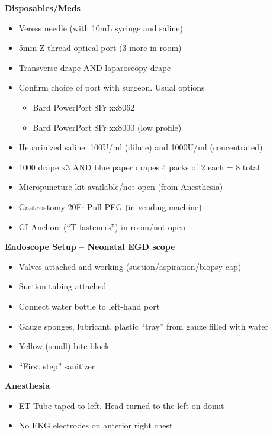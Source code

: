 \documentclass[
]{book}
\providecommand{\tightlist}{%
  \setlength{\itemsep}{0pt}\setlength{\parskip}{0pt}}
\begin{document}
\textbf{Disposables/Meds}

\begin{itemize}
\tightlist
\item
  Veress needle (with 10mL syringe and saline)
\item
  5mm Z-thread optical port (3 more in room)
\item
  Transverse drape AND laparoscopy drape
\item
  Confirm choice of port with surgeon. Usual options

  \begin{itemize}
  \tightlist
  \item
    Bard PowerPort 8Fr xx8062
  \item
    Bard PowerPort 8Fr xx8000 (low profile)
  \end{itemize}
\item
  Heparinized saline: 100U/ml (dilute) and 1000U/ml (concentrated)
\item
  1000 drape x3 AND blue paper drapes 4 packs of 2 each = 8 total
\item
  Micropuncture kit available/not open (from Anesthesia)
\item
  Gastrostomy 20Fr Pull PEG (in vending machine)
\item
  GI Anchors (``T-fasteners'') in room/not open
\end{itemize}

\textbf{Endoscope Setup -- Neonatal EGD scope}

\begin{itemize}
\tightlist
\item
  Valves attached and working (suction/aspiration/biopsy cap)
\item
  Suction tubing attached
\item
  Connect water bottle to left-hand port
\item
  Gauze sponges, lubricant, plastic ``tray'' from gauze filled with water
\item
  Yellow (small) bite block
\item
  ``First step'' sanitizer
\end{itemize}

\textbf{Anesthesia}

\begin{itemize}
\tightlist
\item
  ET Tube taped to left. Head turned to the left on donut
\item
  No EKG electrodes on anterior right chest
\end{itemize}
\end{document}
